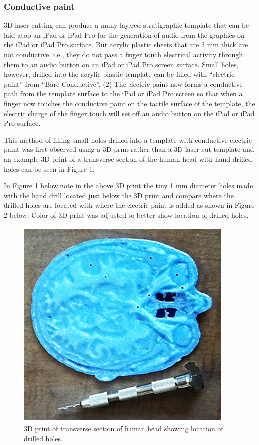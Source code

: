 \documentclass[11.5pt]{sig-alternate} %
\begin{document}
\begin{large}
\subsubsection*{Conductive paint}

3D laser cutting can produce a many layered stratigraphic template that can be laid atop an iPad or iPad Pro for the generation of audio from the graphics on the iPad or iPad Pro surface.  But acrylic plastic sheets that are 3 mm thick are not conductive, i.e., they do not pass a finger touch electrical activity through them to an audio button on an iPad or iPad Pro screen surface.  Small holes, however, drilled into the acrylic plastic template can be filled with “electric paint” from “Bare Conductive”. (2)  The electric paint now forms a conductive path from the template surface to the iPad or iPad Pro screen so that when a finger now touches the conductive paint on the tactile surface of the template, the electric charge of the finger touch will set off an audio button on the iPad or iPad Pro surface.
     
This method of filling small holes drilled into a template with conductive electric paint was first observed using a 3D print rather than a 3D laser cut template and an example 3D print of a transverse section of the human head with hand drilled holes can be seen in Figure 1.
      
In Figure 1 below,note in the above 3D print the tiny 1 mm diameter holes made with the hand drill located just below the 3D print and compare where the drilled holes are located with where the electric paint is added as shown in Figure 2 below.  Color of 3D print was adjusted to better show location of drilled holes.

\begin{figure}[h]
    \centering
    \includegraphics[width=1\linewidth]{fig 1.png}
    \caption{ 3D print of transverse section of human head showing location of drilled holes.}
    

\end{figure}
\end{large}
\end{document}

